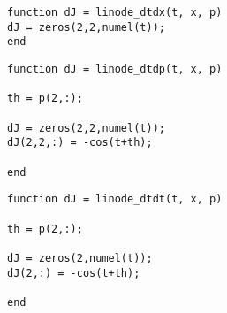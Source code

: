 \begin{lstlisting}[language=coco-highlight]
function dJ = linode_dtdx(t, x, p)
dJ = zeros(2,2,numel(t));
end
\end{lstlisting}
\begin{lstlisting}[language=coco-highlight]
function dJ = linode_dtdp(t, x, p)

th = p(2,:);

dJ = zeros(2,2,numel(t));
dJ(2,2,:) = -cos(t+th);

end
\end{lstlisting}
\begin{lstlisting}[language=coco-highlight]
function dJ = linode_dtdt(t, x, p)

th = p(2,:);

dJ = zeros(2,numel(t));
dJ(2,:) = -cos(t+th);

end
\end{lstlisting}

